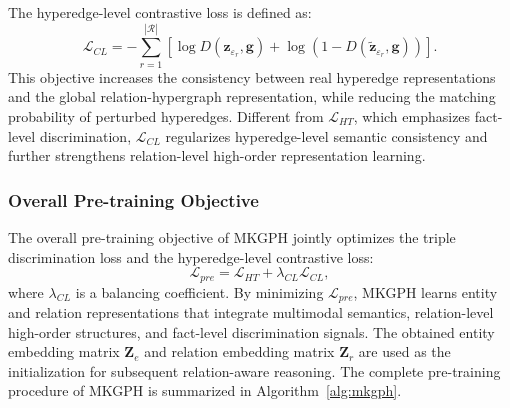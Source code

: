 \documentclass[pdflatex,sn-mathphys-num]{sn-jnl}
\begin{document}
The hyperedge-level contrastive loss is defined as:
\begin{equation}
\mathcal{L}_{CL}
=
-\sum_{r=1}^{|\mathcal{R}|}
\left[
\log
D
\left(
\mathbf{z}_{\varepsilon_r},
\mathbf{g}
\right)
+
\log
\left(
1-
D
\left(
\widetilde{\mathbf{z}}_{\varepsilon_r},
\mathbf{g}
\right)
\right)
\right].
\end{equation}
This objective increases the consistency between real hyperedge representations and the global relation-hypergraph representation, while reducing the matching probability of perturbed hyperedges. Different from $\mathcal{L}_{HT}$, which emphasizes fact-level discrimination, $\mathcal{L}_{CL}$ regularizes hyperedge-level semantic consistency and further strengthens relation-level high-order representation learning. 

\subsubsection{Overall Pre-training Objective}

The overall pre-training objective of MKGPH jointly optimizes the triple discrimination loss and the hyperedge-level contrastive loss:
\begin{equation}
\mathcal{L}_{pre}
=
\mathcal{L}_{HT}
+
\lambda_{CL}\mathcal{L}_{CL},
\end{equation}
where $\lambda_{CL}$ is a balancing coefficient. By minimizing $\mathcal{L}_{pre}$, MKGPH learns entity and relation representations that integrate multimodal semantics, relation-level high-order structures, and fact-level discrimination signals. The obtained entity embedding matrix $\mathbf{Z}_{e}$ and relation embedding matrix $\mathbf{Z}_{r}$ are used as the initialization for subsequent relation-aware reasoning. The complete pre-training procedure of MKGPH is summarized in Algorithm~\ref{alg:mkgph}.
\end{document}
